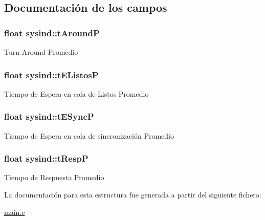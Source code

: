 \subsection{Documentación de los campos}
\hypertarget{structsysind_a06eba9823dc8177cb687b7337869aaef}{
\subsubsection[{t\-Around\-P}]{\setlength{\rightskip}{0pt plus 5cm}float sysind\-::t\-Around\-P}}\label{structsysind_a06eba9823dc8177cb687b7337869aaef}
Turn Around Promedio \hypertarget{structsysind_afd4637d57dff2e166ea431b016f75b5a}{
\subsubsection[{t\-E\-Listos\-P}]{\setlength{\rightskip}{0pt plus 5cm}float sysind\-::t\-E\-Listos\-P}}\label{structsysind_afd4637d57dff2e166ea431b016f75b5a}
Tiempo de Espera en cola de Listos Promedio \hypertarget{structsysind_aaec14f627654b7bd5f8d108338536a4c}{
\subsubsection[{t\-E\-Sync\-P}]{\setlength{\rightskip}{0pt plus 5cm}float sysind\-::t\-E\-Sync\-P}}\label{structsysind_aaec14f627654b7bd5f8d108338536a4c}
Tiempo de Espera en cola de sincronización Promedio \hypertarget{structsysind_a86e05f4616e5e694050acf216b13c754}{
\subsubsection[{t\-Resp\-P}]{\setlength{\rightskip}{0pt plus 5cm}float sysind\-::t\-Resp\-P}}\label{structsysind_a86e05f4616e5e694050acf216b13c754}
Tiempo de Respuesta Promedio 

La documentación para esta estructura fue generada a partir del siguiente fichero\-:\begin{DoxyCompactItemize}
\item 
\hyperlink{main_8c}{main.\-c}\end{DoxyCompactItemize}
